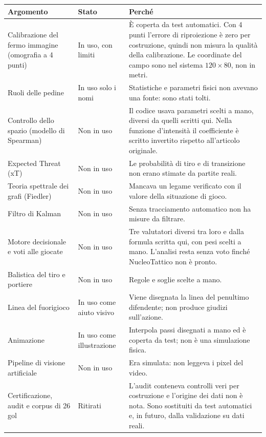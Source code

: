 \documentclass[11pt,a4paper]{article}
\begin{document}
\begin{longtable}{p{}p{}p{}}
\toprule
\textbf{Argomento} & \textbf{Stato} & \textbf{Perché} \\
\midrule
\endhead
Calibrazione del fermo immagine (omografia a 4 punti) & In uso, con limiti & È coperta da test automatici. Con 4 punti l'errore di riproiezione è zero per costruzione, quindi non misura la qualità della calibrazione. Le coordinate del campo sono nel sistema $120 \times 80$, non in metri. \\
Ruoli delle pedine & In uso solo i nomi & Statistiche e parametri fisici non avevano una fonte: sono stati tolti. \\
Controllo dello spazio (modello di Spearman) & Non in uso & Il codice usava parametri scelti a mano, diversi da quelli scritti qui. Nella funzione d'intensità il coefficiente è scritto invertito rispetto all'articolo originale. \\
Expected Threat (xT) & Non in uso & Le probabilità di tiro e di transizione non erano stimate da partite reali. \\
Teoria spettrale dei grafi (Fiedler) & Non in uso & Mancava un legame verificato con il valore della situazione di gioco. \\
Filtro di Kalman & Non in uso & Senza tracciamento automatico non ha misure da filtrare. \\
Motore decisionale e voti alle giocate & Non in uso & Tre valutatori diversi tra loro e dalla formula scritta qui, con pesi scelti a mano. L'analisi resta senza voto finché NucleoTattico non è pronto. \\
Balistica del tiro e portiere & Non in uso & Regole e soglie scelte a mano. \\
Linea del fuorigioco & In uso come aiuto visivo & Viene disegnata la linea del penultimo difendente; non produce giudizi sull'azione. \\
Animazione & In uso come illustrazione & Interpola passi disegnati a mano ed è coperta da test; non è una simulazione fisica. \\
Pipeline di visione artificiale & Non in uso & Era simulata: non leggeva i pixel del video. \\
Certificazione, audit e corpus di 26 gol & Ritirati & L'audit conteneva controlli veri per costruzione e l'origine dei dati non è nota. Sono sostituiti da test automatici e, in futuro, dalla validazione su dati reali. \\
\bottomrule
\end{longtable}
\end{document}
